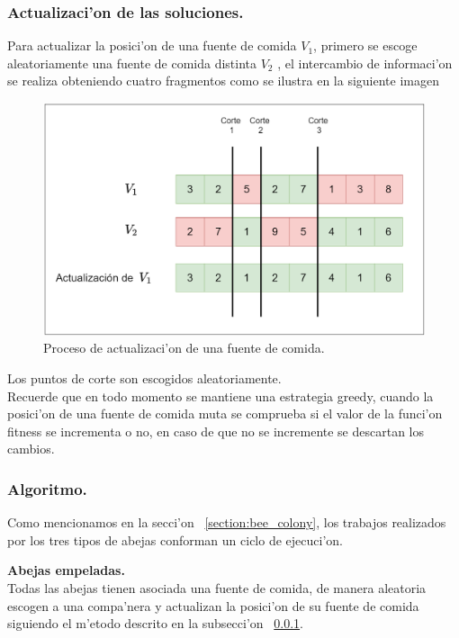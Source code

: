 \documentclass[12pt]{article}
\begin{document}
    \subsubsection{Actualizaci'on de las soluciones.}\label{section: merge}

    Para actualizar la posici'on de una fuente de comida $V_{1}$, primero se
    escoge aleatoriamente una fuente de comida distinta $V_{2}$ , el intercambio
    de informaci'on se realiza obteniendo cuatro fragmentos como se ilustra en
    la siguiente imagen

    \begin{figure}[H]
        \centering
        \includegraphics[scale=0.35]{merge.png}
        \caption{Proceso de actualizaci'on de una fuente de comida.}
        \label{fig:merge}
    \end{figure}


    Los puntos de corte son escogidos aleatoriamente.\\
    Recuerde que en todo momento se mantiene una estrategia greedy, cuando la posici'on de una fuente de comida muta se comprueba
    si el valor de la funci'on fitness se incrementa o no, en caso de que no se incremente se descartan los cambios.


    \subsubsection{Algoritmo.}
    Como mencionamos en la secci'on ~\ref{section:bee_colony}, los trabajos realizados por los tres tipos de abejas
    conforman un ciclo de ejecuci'on.

    \textbf{Abejas empeladas.}\\
    Todas las abejas tienen asociada una fuente de comida, de manera aleatoria escogen a una compa'nera y
    actualizan la posici'on de su fuente de comida siguiendo el m'etodo descrito en la subsecci'on ~\ref{section: merge}.
\end{document}
